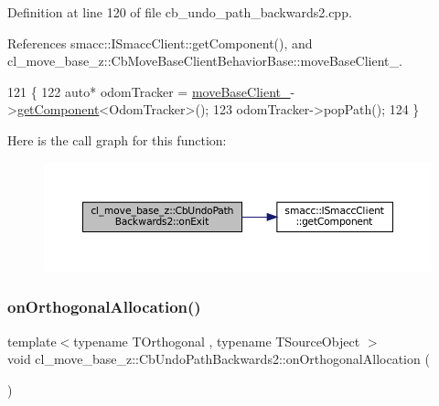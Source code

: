 Definition at line 120 of file cb\+\_\+undo\+\_\+path\+\_\+backwards2.\+cpp.



References smacc\+::\+I\+Smacc\+Client\+::get\+Component(), and cl\+\_\+move\+\_\+base\+\_\+z\+::\+Cb\+Move\+Base\+Client\+Behavior\+Base\+::move\+Base\+Client\+\_\+.


\begin{DoxyCode}
121 \{
122   \textcolor{keyword}{auto}* odomTracker = \hyperlink{classcl__move__base__z_1_1CbMoveBaseClientBehaviorBase_ab2ef219464cfac8659b4a87c8d0db6d5}{moveBaseClient\_}->\hyperlink{classsmacc_1_1ISmaccClient_adef78db601749ca63c19e74a27cb88cc}{getComponent}<OdomTracker>();
123   odomTracker->popPath();
124 \}
\end{DoxyCode}
Here is the call graph for this function\+:
\nopagebreak
\begin{figure}[H]
\begin{center}
\leavevmode
\includegraphics[width=350pt]{classcl__move__base__z_1_1CbUndoPathBackwards2_ae493fcd813176d8473ff08680beb7afe_cgraph}
\end{center}
\end{figure}
\mbox{\label{classcl__move__base__z_1_1CbUndoPathBackwards2_a61148b9509b489efc382ecdeb9bcf9c2}} 
\subsubsection{\texorpdfstring{on\+Orthogonal\+Allocation()}{onOrthogonalAllocation()}}
{\footnotesize\ttfamily template$<$typename T\+Orthogonal , typename T\+Source\+Object $>$ \\
void cl\+\_\+move\+\_\+base\+\_\+z\+::\+Cb\+Undo\+Path\+Backwards2\+::on\+Orthogonal\+Allocation (\begin{DoxyParamCaption}{ }\end{DoxyParamCaption})\hspace{0.3cm}{\ttfamily [inline]}}



